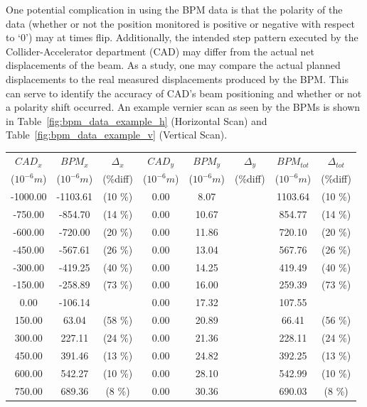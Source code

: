 One potential complication in using the BPM data is that the polarity of the
data (whether or not the position monitored is positive or negative with respect
to `0') may at times flip. Additionally, the intended step pattern executed by
the Collider-Accelerator department (CAD) may differ from the actual net
displacements of the beam. As a study, one may compare the actual planned
displacements to the real measured displacements produced by the BPM. This can
serve to identify the accuracy of CAD's beam positioning and whether or not a
polarity shift occurred. An example vernier scan as seen by the BPMs is shown in
Table~\ref{fig:bpm_data_example_h} (Horizontal Scan) and
Table~\ref{fig:bpm_data_example_v} (Vertical Scan).

\begin{table}[ht]
  \centering
  \begin{tabular}{c c c c c c c c}
    \toprule
    \textbf{$CAD_{x}$} & \textbf{$BPM_{x}$ } & \textbf{$\Delta_{x}$} &\textbf{$CAD_{y}$} & \textbf{$BPM_{y}$} & \textbf{$\Delta_{y}$} & \textbf{$BPM_{tot}$} & \textbf{$\Delta_{tot}$} \\
    ($10^{-6} m$) & ($10^{-6} m$) & (\%diff) & ($10^{-6} m$) & ($10^{-6} m$) & (\%diff) & ($10^{-6} m$) & (\%diff) \\
    \midrule
    -1000.00 & -1103.61 &  (10 \%) & 0.00 & 8.07 &  & 1103.64 &  (10 \%)\\
    -750.00 & -854.70 &  (14 \%) & 0.00 & 10.67 &  & 854.77 &  (14 \%)\\
    -600.00 & -720.00 &  (20 \%) & 0.00 & 11.86 &  & 720.10 &  (20 \%)\\
    -450.00 & -567.61 &  (26 \%) & 0.00 & 13.04 &  & 567.76 &  (26 \%)\\
    -300.00 & -419.25 &  (40 \%) & 0.00 & 14.25 &  & 419.49 &  (40 \%)\\
    -150.00 & -258.89 &  (73 \%) & 0.00 & 16.00 &  & 259.39 &  (73 \%)\\
    0.00 & -106.14 &  & 0.00 & 17.32 &  & 107.55 & \\
    150.00 & 63.04 &  (58 \%) & 0.00 & 20.89 &  & 66.41 &  (56 \%)\\
    300.00 & 227.11 &  (24 \%) & 0.00 & 21.36 &  & 228.11 &  (24 \%)\\
    450.00 & 391.46 &  (13 \%) & 0.00 & 24.82 &  & 392.25 &  (13 \%)\\
    600.00 & 542.27 &  (10 \%) & 0.00 & 28.10 &  & 542.99 &  (10 \%)\\
    750.00 & 689.36 &  (8 \%) & 0.00 & 30.36 &  & 690.03 &  (8 \%)\\

\end{tabular}
\end{table}
